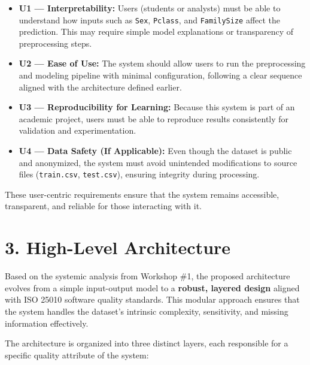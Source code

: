 \documentclass[12pt]{report}
\begin{document}
\begin{itemize}
    \item \textbf{U1 — Interpretability:}  
    Users (students or analysts) must be able to understand how inputs such as \texttt{Sex}, \texttt{Pclass}, and \texttt{FamilySize} 
    affect the prediction. This may require simple model explanations or transparency of preprocessing steps.

    \item \textbf{U2 — Ease of Use:}  
    The system should allow users to run the preprocessing and modeling pipeline with minimal configuration, following a 
    clear sequence aligned with the architecture defined earlier.

    \item \textbf{U3 — Reproducibility for Learning:}  
    Because this system is part of an academic project, users must be able to reproduce results consistently for validation 
    and experimentation.

    \item \textbf{U4 — Data Safety (If Applicable):}  
    Even though the dataset is public and anonymized, the system must avoid unintended modifications to source files 
    (\texttt{train.csv}, \texttt{test.csv}), ensuring integrity during processing.
\end{itemize}

These user-centric requirements ensure that the system remains accessible, transparent, and reliable for those interacting with it.


\section*{3. High-Level Architecture}

Based on the systemic analysis from Workshop \#1, the proposed architecture evolves from a simple input-output model to a \textbf{robust, layered design} aligned with ISO 25010 software quality standards. This modular approach ensures that the system handles the dataset's intrinsic complexity, sensitivity, and missing information effectively.

The architecture is organized into three distinct layers, each responsible for a specific quality attribute of the system:
\end{document}
